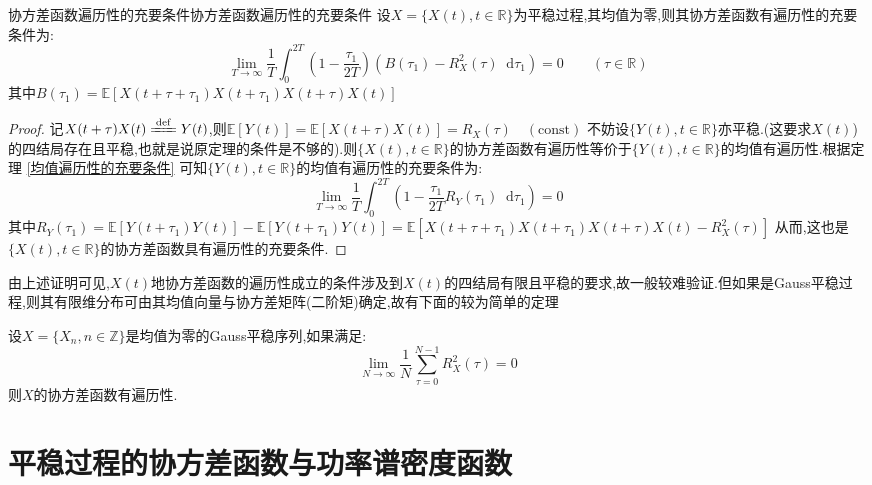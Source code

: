 \documentclass{elegantbook}
\renewcommand\d{\mathop{}\!\mathrm{d}}
\newcommand{\const}{\mathrm{const}}
\newcommand\E{\mathbb{E}}
\newcommand{\defeq}{\xlongequal{\mathrm{def}}}%
\newcommand{\red}{\color{red}}
\begin{document}
\begin{theorem}{协方差函数遍历性的充要条件}{协方差函数遍历性的充要条件}
	设$X=\{X(t),t\in\mathbb{R}\}$为平稳过程,{\red 其均值为零},则其协方差函数有遍历性的充要条件为:
	\[\lim_{T \to \infty}\frac{1}{T}\int_{0}^{2T}\left(1-\frac{\tau_1}{2T}\right)(B(\tau_1)-R_{X}^2(\tau)\d \tau_1) = 0\qquad (\tau \in\mathbb{R})\]
	其中$B(\tau_1)=\E[X(t+\tau+\tau_1)X(t+\tau_1)X(t+\tau)X(t)]$
	\begin{proof}
		记$X(t+\tau)X(t)\defeq Y(t)$,则$\E[Y(t)] = \E[X(t+\tau)X(t)] = R_{X}(\tau)\quad (\const)$
		不妨设$\{Y(t),t\in\mathbb{R}\}$亦平稳.(这要求$X(t)$)的四结局存在且平稳,也就是说原定理的条件是不够的).则$\{X(t),t\in\mathbb{R}\}$的协方差函数有遍历性等价于$\{Y(t),t\in\mathbb{R}\}$的均值有遍历性.根据定理 \ref{均值遍历性的充要条件} 可知$\{Y(t),t\in\mathbb{R}\}$的均值有遍历性的充要条件为:
		\[\lim_{T \to \infty}\frac{1}{T}\int_{0}^{2T}\left(1-\frac{\tau_1}{2T}R_{Y}(\tau_1)\d \tau_1\right) = 0\]
		其中$R_{Y}(\tau_1) = \E[Y(t+\tau_1)Y(t)] - \E[Y(t+\tau_1)Y(t)] = \E[X(t+\tau+\tau_1)X(t+\tau_1)X(t+\tau)X(t) - R_{X}^2(\tau)]$
		从而,这也是$\{X(t),t\in\mathbb{R}\}$的协方差函数具有遍历性的充要条件.
	\end{proof}
\end{theorem}
\begin{remark}
	由上述证明可见,$X(t)$地协方差函数的遍历性成立的条件涉及到$X(t)$的四结局有限且平稳的要求,故一般较难验证.但如果是Gauss平稳过程,则其有限维分布可由其均值向量与协方差矩阵(二阶矩)确定,故有下面的较为简单的定理
\end{remark}

\begin{theorem}{}{}
	设$X=\{X_n,n\in\mathbb{Z}\}$是{\red 均值为零}的Gauss平稳序列,如果满足:
	\[\lim_{N \to \infty}\frac{1}{N}\sum_{\tau=0}^{N-1}R_{X}^2(\tau) = 0\]
	则$X$的协方差函数有遍历性.
\end{theorem}

\section{平稳过程的协方差函数与功率谱密度函数}
\end{document}
